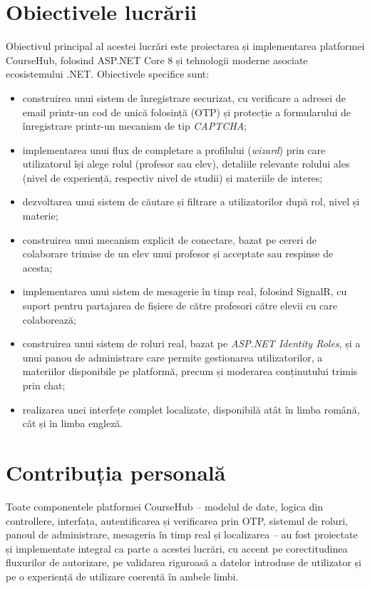 \section{Obiectivele lucrării}

Obiectivul principal al acestei lucrări este proiectarea și implementarea platformei
CourseHub, folosind ASP.NET Core 8 și tehnologii moderne asociate ecosistemului
.NET. Obiectivele specifice sunt:

\begin{itemize}
    \item construirea unui sistem de înregistrare securizat, cu verificare a adresei de
    email printr-un cod de unică folosință (OTP) și protecție a formularului de
    înregistrare printr-un mecanism de tip \emph{CAPTCHA};
    \item implementarea unui flux de completare a profilului (\emph{wizard}) prin care
    utilizatorul își alege rolul (profesor sau elev), detaliile relevante rolului ales
    (nivel de experiență, respectiv nivel de studii) și materiile de interes;
    \item dezvoltarea unui sistem de căutare și filtrare a utilizatorilor după rol, nivel
    și materie;
    \item construirea unui mecanism explicit de conectare, bazat pe cereri de colaborare
    trimise de un elev unui profesor și acceptate sau respinse de acesta;
    \item implementarea unui sistem de mesagerie în timp real, folosind SignalR,
    cu suport pentru partajarea de fișiere de către profesori către elevii cu care
    colaborează;
    \item construirea unui sistem de roluri real, bazat pe \emph{ASP.NET Identity Roles},
    și a unui panou de administrare care permite gestionarea utilizatorilor, a materiilor
    disponibile pe platformă, precum și moderarea conținutului trimis prin chat;
    \item realizarea unei interfețe complet localizate, disponibilă atât în limba română,
    cât și în limba engleză.
\end{itemize}

\section{Contribuția personală}

Toate componentele platformei CourseHub -- modelul de date, logica din controllere,
interfața, autentificarea și verificarea prin OTP, sistemul de roluri, panoul de
administrare, mesageria în timp real și localizarea -- au fost proiectate și
implementate integral ca parte a acestei lucrări, cu accent pe corectitudinea
fluxurilor de autorizare, pe validarea riguroasă a datelor introduse de utilizator
și pe o experiență de utilizare coerentă în ambele limbi.

